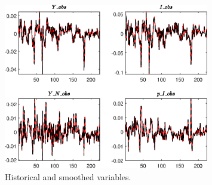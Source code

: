  
\begin{figure}[H]
\centering 
\includegraphics[width=0.80\textwidth]{BRS_aggregate/graphs/BRS_aggregate_HistoricalAndSmoothedVariables1}
\caption{Historical and smoothed variables.}\label{Fig:HistoricalAndSmoothedVariables:1}
\end{figure}


